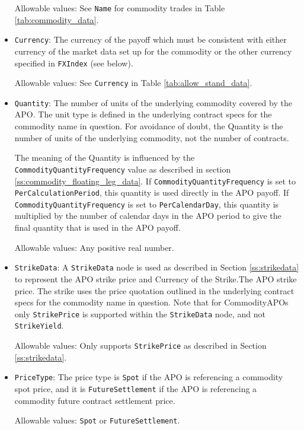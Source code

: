 \begin{itemize}
Allowable values:  See \lstinline!Name! for commodity trades in Table \ref{tab:commodity_data}.

\item \lstinline!Currency!: The currency of the payoff which must be consistent with either currency of the market data set up for the commodity or the other currency specified in \lstinline!FXIndex! (see below).

Allowable values: See \lstinline!Currency!  in Table \ref{tab:allow_stand_data}.

\item \lstinline!Quantity!:  The number of units of the underlying commodity covered by the APO. The unit type is defined in the underlying contract specs for the commodity name in question. For avoidance of doubt, the Quantity is the number of units of the underlying commodity, not the number of contracts.

The meaning of the Quantity is influenced by the \lstinline!CommodityQuantityFrequency! value as described in section \ref{ss:commodity_floating_leg_data}. If \lstinline!CommodityQuantityFrequency! is set to \lstinline!PerCalculationPeriod!, this quantity is used directly in the APO payoff. If \lstinline!CommodityQuantityFrequency! is set to \lstinline!PerCalendarDay!, this quantity is multiplied by the number of calendar days in the APO period to give the final quantity that is used in the APO payoff.

Allowable values: Any positive real number.

\item \lstinline!StrikeData!: A \lstinline!StrikeData! node is used as described in Section \ref{ss:strikedata} to represent the APO strike price and Currency of the Strike.The APO strike price. The strike uses the price quotation outlined in the underlying contract specs for the commodity name in question. Note that for CommodityAPOs only \lstinline!StrikePrice!  is supported within the \lstinline!StrikeData! node, and not \lstinline!StrikeYield!. 

Allowable values: Only supports \lstinline!StrikePrice! as described in Section \ref{ss:strikedata}.

\item \lstinline!PriceType!: The price type is \lstinline!Spot! if the APO is referencing a commodity spot price, and it is \lstinline!FutureSettlement! if the APO is referencing a commodity future contract settlement price.

Allowable values: \lstinline!Spot! or \lstinline!FutureSettlement!.


\end{itemize}

